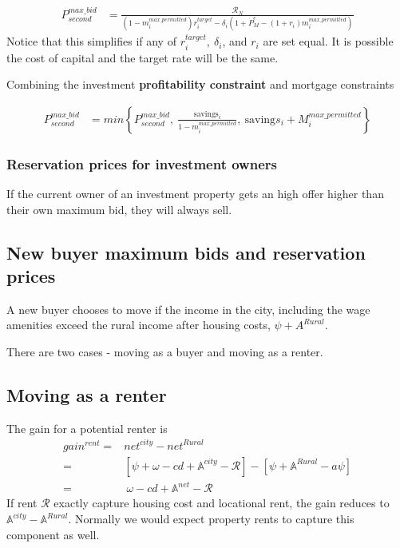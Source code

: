 { \begin{eqnarray}\label{eqn-max-second-bid}
P_{second}^{max\_bid} & = \frac{\mathcal{R}_N}{(1-m_i^{max\_permitted})r_i^{target}-\delta_i \left(1 + \dot P_M^e - (1+r_i)m_i^{max\_permitted}\right)} 
\end{eqnarray}
Notice that this simplifies if any of $r_i^{target},\ \delta_i$, and $r_i$ are set equal. It is possible the cost of capital and the target rate will be the same.

Combining the investment \textbf{profitability constraint} and mortgage constraints

\begin{eqnarray}
P_{second}^{max\_bid} & = min \left\{P_{second}^{max\_bid},\ \frac{\mathrm{savings}_i}{1-m_i^{max\_permitted}},\ \mathrm{saving}s_i + M_i^{max\_permitted}  \right\}  \nonumber
\end{eqnarray}

\subsubsection{Reservation prices for investment owners}
If the current owner of an investment  property gets an high offer higher than their own maximum bid, they will always sell.  


\subsection{New buyer maximum bids and reservation prices }
A new buyer chooses to move if the income in the city, including the wage amenities exceed the rural income after housing costs, $\psi+A^{Rural}$. 

There are two cases - moving as a buyer and moving as a renter.

\subsection{Moving as a renter}
The gain for a potential renter is 
\begin{align}
gain^{rent}=&net^{city}-net^{Rural}\nonumber\\
=&\left[\psi+\omega-cd+\mathbb{A}^{city}-\mathcal{R}\right]-\left[\psi+\mathbb{A}^{Rural}-a\psi\right] \nonumber\\
=&\ \omega-cd+\mathbb{A}^{net}-\mathcal{R}
\label{eq-move-to-rent}
\end{align}
If rent $\mathcal{R}$ exactly capture housing cost and locational rent, the gain reduces to $\mathbb{A}^{city}-\mathbb{A}^{Rural}$. Normally we would expect property rents to capture this component  as well. 

}
